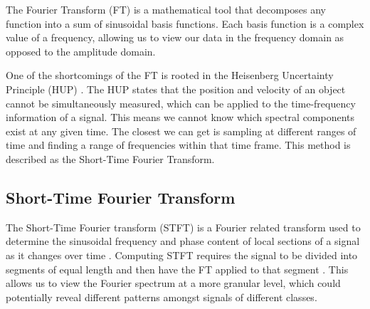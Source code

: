 \documentclass{turabian-thesis}
\begin{document}

The Fourier Transform (FT) is a mathematical tool that decomposes any function into a sum of sinusoidal basis functions. Each basis function is a complex value of a frequency, allowing us to view our data in the frequency domain as opposed to the amplitude domain.

One of the shortcomings of the FT is rooted in the Heisenberg Uncertainty Principle (HUP) \cite{hill_uncertainty_nodate}.  The HUP states that the position and velocity of an object cannot be simultaneously measured, which can be applied to the time-frequency information of a signal. This means we cannot know which spectral components exist at any given time. The closest we can get is sampling at different ranges of time and finding a range of frequencies within that time frame. This method is described as the Short-Time Fourier Transform.






\subsection{Short-Time Fourier Transform}
The Short-Time Fourier transform (STFT) is a Fourier related transform used to determine the sinusoidal frequency and phase content of local sections of a signal as it changes over time \cite{hill_uncertainty_nodate}.
Computing STFT requires the signal to be divided into segments of equal length and then have the FT applied to that segment \cite{allen_unified_1977}. This allows us to view the Fourier spectrum at a more granular level, which could potentially reveal different patterns amongst signals of different classes.
\end{document}
